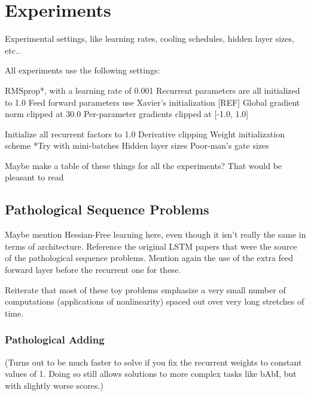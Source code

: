 \documentclass{article}
\begin{document}
%
%
\section{Experiments}
\label{others}
Experimental settings, like learning rates, cooling schedules, hidden layer sizes, etc..

All experiments use the following settings:

RMSprop*, with a learning rate of 0.001
Recurrent parameters are all initialized to 1.0
Feed forward parameters use Xavier’s initialization [REF]
Global gradient norm clipped at 30.0
Per-parameter gradients clipped at [-1.0, 1.0]

Initialize all recurrent factors to 1.0
Derivative clipping
Weight initialization scheme
*Try with mini-batches
Hidden layer sizes
Poor-man’s gate sizes

Maybe make a table of these things for all the experiments? That would be pleasant to read


\subsection{Pathological Sequence Problems}

Maybe mention Hessian-Free learning here, even though it isn’t really the same in terms of architecture.
Reference the original LSTM papers that were the source of the pathological sequence problems.
Mention again the use of the extra feed forward layer before the recurrent one for these.

Reiterate that most of these toy problems emphasize a very small number of computations (applications of nonlinearity) spaced out over very long stretches of time.

\subsubsection{Pathological Adding}

(Turns out to be much faster to solve if you fix the recurrent weights to constant values of 1. Doing so still allows solutions to more complex tasks like bAbI, but with slightly worse scores.)
\end{document}
